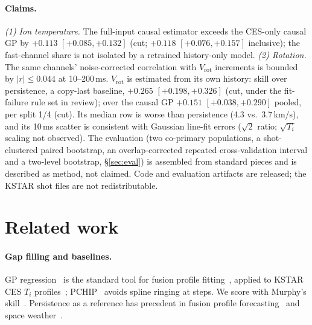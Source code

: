 \documentclass[10pt,twocolumn,letterpaper]{article}
\newcommand{\Ti}{\ensuremath{T_i}}
\newcommand{\Vrot}{\ensuremath{V_\mathrm{rot}}}
\begin{document}
\paragraph{Claims.}
\emph{(1) Ion temperature.} The full-input causal estimator exceeds the CES-only causal
GP by $+0.113$ $[+0.085, +0.132]$ (cut; $+0.118$ $[+0.076, +0.157]$ inclusive); the
fast-channel share is not isolated by a retrained history-only model.
\emph{(2) Rotation.} The same channels' noise-corrected correlation with \Vrot{}
increments is bounded by $|r| \leq 0.044$ at 10--200\,ms. \Vrot{} is estimated from its
own history: skill over persistence, a copy-last baseline, $+0.265$
$[+0.198, +0.326]$ (cut, under the fit-failure rule set in review); over the causal GP
$+0.151$ $[+0.038, +0.290]$ pooled, per split 1/4 (cut). Its median row is worse than
persistence (4.3 vs.\ 3.7\,km/s), and its 10\,ms scatter is consistent with Gaussian
line-fit errors ($\sqrt2$ ratio; $\sqrt{T_i}$ scaling not observed).
The evaluation (two co-primary populations, a shot-clustered paired bootstrap, an
overlap-corrected repeated cross-validation interval and a two-level bootstrap,
\S\ref{sec:eval}) is assembled from standard pieces and is described as method, not
claimed. Code and evaluation artifacts are released; the KSTAR shot files are not
redistributable.

\section{Related work}
\label{sec:related}

\paragraph{Gap filling and baselines.} GP regression~\citep{rasmussen2006} is the
standard tool for fusion profile fitting~\citep{chilenski2015,michoski2024}, applied
to KSTAR CES \Ti{} profiles~\citep{Kim2024KineticProfile}; PCHIP~\citep{fritsch1980}
avoids spline ringing at steps. We score with Murphy's skill~\citep{murphy1988}.
Persistence as a reference has precedent in fusion profile
forecasting~\citep{Abbate2025Combining} and space weather~\citep{Owens2013Persistence}.
\end{document}
